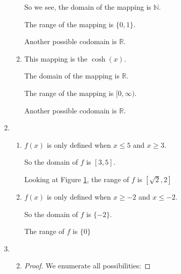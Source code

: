 \documentclass[12pt,letterpaper]{article}
\begin{document}
\begin{enumerate}
\begin{enumerate}
\begin{enumerate}
              So we see,
              the domain of the mapping is $\mathbb{N}$.

              The range of the mapping is $\{0, 1\}$.

              Another possible codomain is $\mathbb{R}$.
            \item
              This mapping is the $\cosh(x)$.

              The domain of the mapping is $\mathbb{R}$.

              The range of the mapping is $[0, \infty)$.

              Another possible codomain is $\mathbb{R}$.
          \end{enumerate}
        \item
          \begin{enumerate}
            \begin{figure}
              \centering
              \begin{minipage}{.5\textwidth}
                \label{fig:a}
              \end{minipage}%
            \end{figure}

            \setcounter{enumiii}{4}
            \item
              $f(x)$ is only defined when $x \leq 5$ and $x \geq 3$.

              So the domain of $f$ is $[3, 5]$.

              Looking at Figure \ref{fig:a},
              the range of $f$ is $[\sqrt{2}, 2]$
            \item
              $f(x)$ is only defined when $x \geq -2$ and $x \leq -2$.

              So the domain of $f$ is $\{-2\}$.

              The range of $f$ is $\{0\}$
          \end{enumerate}
        \item
          \begin{enumerate}
            \setcounter{enumiii}{1}
            \item
              \begin{proof}
                We enumerate all possibilities:


\end{proof}
\end{enumerate}
\end{enumerate}
\end{enumerate}
\end{document}
